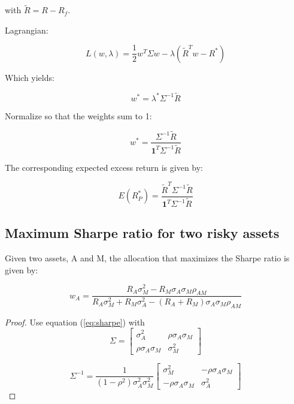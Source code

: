 \documentclass[
  11pt,
]{article}
\begin{document}
with \(\tilde{R} = R-R_f\).

Lagrangian:

\[
L(w, \lambda) = \frac{1}{2} w^T \Sigma w - \lambda \left(\tilde{R}^Tw - R^* \right)
\]

Which yields:

\begin{equation}
w^* = \lambda^* \Sigma^{-1} \tilde{R}
\label{eq:w-star}
\end{equation}

Normalize so that the weights sum to 1:

\begin{equation}
w^* = \frac{\Sigma^{-1} \tilde{R}}{\mathbf{1}^T\Sigma^{-1} \tilde{R}}
\label{eq:sharpe}
\end{equation}

The corresponding expected excess return is given by:

\[
E(R^*_P) = \frac{\tilde{R}^T \Sigma^{-1} \tilde{R}}{\mathbf{1}^T\Sigma^{-1} \tilde{R}}
\]

\hypertarget{maximum-sharpe-ratio-for-two-risky-assets}{%
\subsection{Maximum Sharpe ratio for two risky
assets}\label{maximum-sharpe-ratio-for-two-risky-assets}}

Given two assets, A and M, the allocation that maximizes the Sharpe
ratio is given by:

\begin{equation}
w_A = \frac{R_A \sigma^2_M - R_M \sigma_A \sigma_M \rho_{AM}}{R_A \sigma^2_M + R_M \sigma^2_A - (R_A+R_M) \sigma_A \sigma_M \rho_{AM}}
\label{eq:wA}
\end{equation}

\begin{proof}
Use equation (\ref{eq:sharpe}) with 
\begin{equation}
\Sigma = \begin{bmatrix} \sigma^2_A & \rho \sigma_A \sigma_M \\ \rho \sigma_A \sigma_M & \sigma^2_M \end{bmatrix}
\label{eq:sigma}
\end{equation}

$$
\Sigma^{-1} = \frac{1}{(1-\rho^2) \sigma^2_A\sigma^2_M} \begin{bmatrix} \sigma^2_M & -\rho \sigma_A \sigma_M \\ -\rho \sigma_A \sigma_M & \sigma^2_A \end{bmatrix}
$$
\end{proof}
\end{document}
